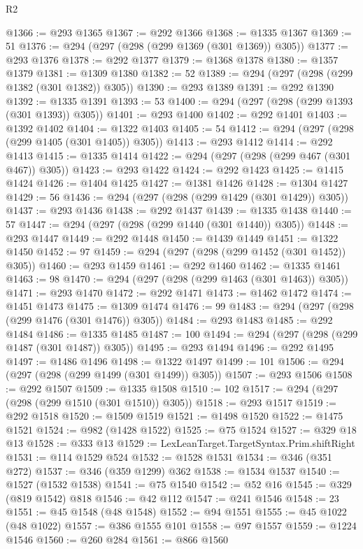 \begin{lexlean}{R2}
\begin{coremodule}
@1366 := @293 @1365
@1367 := @292 @1366
@1368 := @1335 @1367
@1369 := 51
@1376 := @294 (@297 (@298 (@299 @1369 (@301 @1369)) @305))
@1377 := @293 @1376
@1378 := @292 @1377
@1379 := @1368 @1378
@1380 := @1357 @1379
@1381 := @1309 @1380
@1382 := 52
@1389 := @294 (@297 (@298 (@299 @1382 (@301 @1382)) @305))
@1390 := @293 @1389
@1391 := @292 @1390
@1392 := @1335 @1391
@1393 := 53
@1400 := @294 (@297 (@298 (@299 @1393 (@301 @1393)) @305))
@1401 := @293 @1400
@1402 := @292 @1401
@1403 := @1392 @1402
@1404 := @1322 @1403
@1405 := 54
@1412 := @294 (@297 (@298 (@299 @1405 (@301 @1405)) @305))
@1413 := @293 @1412
@1414 := @292 @1413
@1415 := @1335 @1414
@1422 := @294 (@297 (@298 (@299 @467 (@301 @467)) @305))
@1423 := @293 @1422
@1424 := @292 @1423
@1425 := @1415 @1424
@1426 := @1404 @1425
@1427 := @1381 @1426
@1428 := @1304 @1427
@1429 := 56
@1436 := @294 (@297 (@298 (@299 @1429 (@301 @1429)) @305))
@1437 := @293 @1436
@1438 := @292 @1437
@1439 := @1335 @1438
@1440 := 57
@1447 := @294 (@297 (@298 (@299 @1440 (@301 @1440)) @305))
@1448 := @293 @1447
@1449 := @292 @1448
@1450 := @1439 @1449
@1451 := @1322 @1450
@1452 := 97
@1459 := @294 (@297 (@298 (@299 @1452 (@301 @1452)) @305))
@1460 := @293 @1459
@1461 := @292 @1460
@1462 := @1335 @1461
@1463 := 98
@1470 := @294 (@297 (@298 (@299 @1463 (@301 @1463)) @305))
@1471 := @293 @1470
@1472 := @292 @1471
@1473 := @1462 @1472
@1474 := @1451 @1473
@1475 := @1309 @1474
@1476 := 99
@1483 := @294 (@297 (@298 (@299 @1476 (@301 @1476)) @305))
@1484 := @293 @1483
@1485 := @292 @1484
@1486 := @1335 @1485
@1487 := 100
@1494 := @294 (@297 (@298 (@299 @1487 (@301 @1487)) @305))
@1495 := @293 @1494
@1496 := @292 @1495
@1497 := @1486 @1496
@1498 := @1322 @1497
@1499 := 101
@1506 := @294 (@297 (@298 (@299 @1499 (@301 @1499)) @305))
@1507 := @293 @1506
@1508 := @292 @1507
@1509 := @1335 @1508
@1510 := 102
@1517 := @294 (@297 (@298 (@299 @1510 (@301 @1510)) @305))
@1518 := @293 @1517
@1519 := @292 @1518
@1520 := @1509 @1519
@1521 := @1498 @1520
@1522 := @1475 @1521
@1524 := @982 (@1428 @1522)
@1525 := @75 @1524
@1527 := @329 @18 @13
@1528 := @333 @13
@1529 := LexLeanTarget.TargetSyntax.Prim.shiftRight
@1531 := @114 @1529 @524
@1532 := @1528 @1531
@1534 := @346 (@351 @272)
@1537 := @346 (@359 @1299) @362
@1538 := @1534 @1537
@1540 := @1527 (@1532 @1538)
@1541 := @75 @1540
@1542 := @52 @16
@1545 := @329 (@819 @1542) @818
@1546 := @42 @112
@1547 := @241 @1546
@1548 := 23
@1551 := @45 @1548 (@48 @1548)
@1552 := @94 @1551
@1555 := @45 @1022 (@48 @1022)
@1557 := @386 @1555 @101
@1558 := @97 @1557
@1559 := @1224 @1546
@1560 := @260 @284
@1561 := @866 @1560

\end{coremodule}
\end{lexlean}

